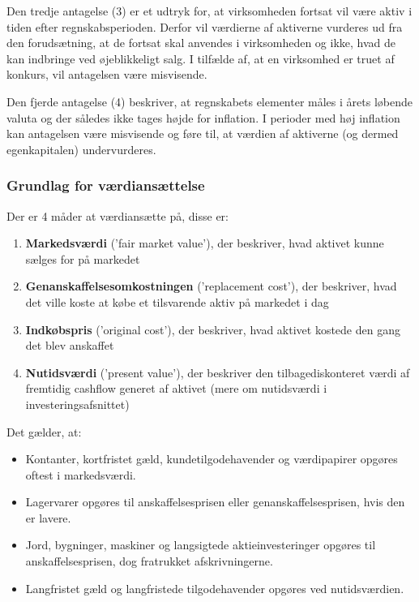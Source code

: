\documentclass[10pt,reqno, usenames]{article}
\begin{document}
\hspace{10 pt}

Den tredje antagelse (3) er et udtryk for, at virksomheden fortsat vil være aktiv i tiden efter regnskabsperioden. Derfor vil værdierne af aktiverne vurderes ud fra den forudsætning, at de fortsat skal anvendes i virksomheden og ikke, hvad de kan indbringe ved øjeblikkeligt salg. I tilfælde af, at en virksomhed er truet af konkurs, vil antagelsen være misvisende. 

\hspace{10 pt}

Den fjerde antagelse (4) beskriver, at regnskabets elementer måles i årets løbende valuta og der således ikke tages højde for inflation. I perioder med høj inflation kan antagelsen være misvisende og føre til, at værdien af aktiverne (og dermed egenkapitalen) undervurderes. 

\subsubsection{Grundlag for værdiansættelse}
Der er 4 måder at værdiansætte på, disse er: 

\begin{enumerate}
    \item \textbf{Markedsværdi} ('fair market value'), der beskriver, hvad aktivet kunne sælges for på markedet
    \item \textbf{Genanskaffelsesomkostningen} ('replacement cost'), der beskriver, hvad det ville koste at købe et tilsvarende aktiv på markedet i dag
    \item \textbf{Indkøbspris} ('original cost'), der beskriver, hvad aktivet kostede den gang det blev anskaffet
    \item \textbf{Nutidsværdi} ('present value'), der beskriver den tilbagediskonteret værdi af fremtidig cashflow generet af aktivet (mere om nutidsværdi i investeringsafsnittet)
\end{enumerate}

Det gælder, at: 


\begin{itemize}
    \item Kontanter, kortfristet gæld, kundetilgodehavender og værdipapirer opgøres oftest i markedsværdi. 
    \item Lagervarer opgøres til anskaffelsesprisen eller genanskaffelsesprisen, hvis den er lavere. 
    \item Jord, bygninger, maskiner og langsigtede aktieinvesteringer opgøres til anskaffelsesprisen, dog fratrukket afskrivningerne.
    \item Langfristet gæld og langfristede tilgodehavender opgøres ved nutidsværdien. 
\end{itemize}
\end{document}
